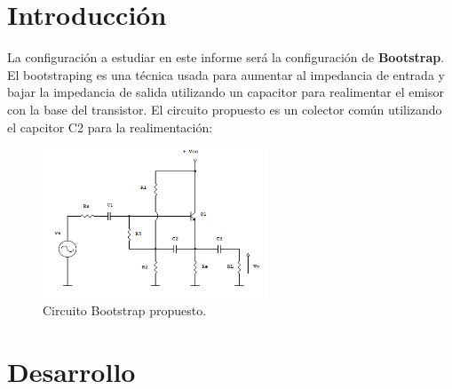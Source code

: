 \documentclass[a4paper]{article}
\begin{document}




\section{Introducción}
La configuración a estudiar en este informe será la configuración de \textbf{Bootstrap}. El bootstraping es una técnica usada para aumentar al impedancia de entrada y bajar la impedancia de salida utilizando un capacitor para realimentar el emisor con la base del transistor. El circuito propuesto es un colector común utilizando el capcitor C2 para la realimentación:
\begin{figure} [H]
	\centering
	\includegraphics[width=0.6\textwidth]{imagenes/bootstrap.PNG}
	\caption{Circuito Bootstrap propuesto.}
	\label{fig:boot}
\end{figure}

\section{Desarrollo}
\end{document}
